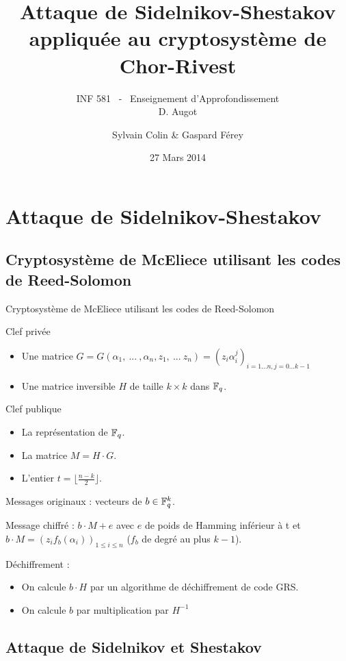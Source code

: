 \documentclass[]{beamer}
\title[Attaque de Chor-Rivest]{Attaque de Sidelnikov-Shestakov appliquée au cryptosystème de Chor-Rivest }
\subtitle{INF 581 \ - \ Enseignement d'Approfondissement \\ D. Augot}
\author[S. Colin \& G. Férey]{Sylvain Colin \& Gaspard Férey}
\institute[X 2011]{Département d'Informatique\\ Ecole Polytechnique, France }
\date{27 Mars 2014}
\begin{document}
\begin{frame}[plain]
  \titlepage
\end{frame}


\section{Attaque de Sidelnikov-Shestakov}

\subsection{Cryptosystème de McEliece utilisant les codes de Reed-Solomon}

\begin{frame}{Cryptosystème de McEliece utilisant les codes de Reed-Solomon}

Clef privée
\begin{itemize}
\item Une matrice $G = G(\alpha_1, \ ... \ , \alpha_n , z_1 , \ ... \ z_n) = (z_i\alpha_i^{j})_{i=1...n, j=0...k-1}$
\item Une matrice inversible $H$ de taille $k\times k$ dans $\mathbb{F}_q$.
\end{itemize}
Clef publique
\begin{itemize}
 \item La représentation de $\mathbb{F}_q$.
 \item La matrice $M=H\cdot G$.
 \item L'entier $t=\lfloor\frac{n-k}{2}\rfloor$.
\end{itemize}
Messages originaux : vecteurs de $b\in \mathbb{F}_q^{k}$.

Message chiffré : $b\cdot M + e$ avec $e$ de poids de Hamming inférieur à t et $b\cdot M=(z_if_b(\alpha_i))_{1\leq i\leq n}$ ($f_b$ de degré au plus $k-1$).

Déchiffrement :
\begin{itemize}
 \item On calcule $b\cdot H$ par un algorithme de déchiffrement de code GRS.
 \item On calcule $b$ par multiplication par $H^{-1}$
\end{itemize}

\end{frame}


\subsection{Attaque de Sidelnikov et Shestakov}
\end{document}

